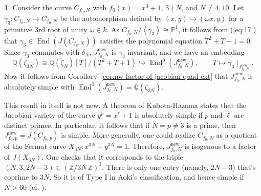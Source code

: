 \documentclass{amsart}[11pt]
\theoremstyle{definition}
\newtheorem{sect}[thm]{}
\numberwithin{equation}{section}
\theoremstyle{notitle}
\begin{document}
    

  

\begin{sect}\label{subsec:cube-x-plus-one}
  Consider the curve $C_{f_0,N}$ with $f_0(x)=x^3+1$, $3\nmid N$, and
  $N\neq 4, 10$. 
  Let $\gamma_3: C_{f_0,N}\to C_{f_0,N}$ be the automorphism defined by
  $(x,y)\mapsto (\omega x, y)$ for a primitive $3$rd root of unity
  $\omega\in k$.  As $C_{f_0,N}/{\left\langle {\gamma_3} \right\rangle}\cong {\mathbb{P}}^1$,
  it follows from (\ref{eq:17}) that $\gamma_3 \in \operatorname{End}
  (J(C_{f_0,N}))$ satisfies the polynomial equation $T^2+T+1=0$. Since
  $\gamma_3$ commutes with $\delta_N$, $J_{f_0,N}^{\mathrm{new}}$ is
  $\gamma_3$-invariant, and we have an embedding
  \[ {\mathbb{Q}}(\zeta_{3N})\cong
  {\mathbb{Q}}(\zeta_N)[T]/(T^2+T+1)\hookrightarrow \operatorname{End}^0(J_{f_0,N}^{\mathrm{new}}),
  \qquad T\mapsto \gamma_3\mid_{J_{f_0,N}^{\mathrm{new}}}.\] Now it follows from
  Corollary~\ref{cor:nw-factor-of-jacobian-quad-ext} that
  $J_{f_0,N}^{\mathrm{new}}$ is absolutely simple with
  $\operatorname{End}^0(J_{f_0,N}^{\mathrm{new}})={\mathbb{Q}}(\zeta_{3N})$.

  This result in itself is not new. A theorem of Kubota-Hazama
  \cite{MR1458755} states that the Jacobian variety of the curve $y^p
  = x^\ell+1$ is absolutely simple if $p$ and $\ell$ are distinct
  primes.  In particular, it follows that if $N=p\neq 3$ is a prime,
  then $J_{f_0, p}^{\mathrm{new}}=J(C_{f_0, p})$ is simple. More generally, one
  could realize $C_{f_0, N}$ as a quotient of the Fermat curve
  $X_{3N}: x^{3N}+y^{3N}=1$. Therefore, $J_{f_0, N}^{\mathrm{new}}$ is isogenous
  to a factor of $J(X_{3N})$. One checks that it corresponds to the
  triple $(N, 3, 2N-3)\in ({\mathbb{Z}/ {3N}\, \mathbb{Z}})^3$. There is only one entry
  (namely, $2N-3$) that's coprime to $3N$.  So it is of Type I in
  Aoki's classification, and hence simple if $N>60$ (cf. \cite[Theorem
  0.2]{MR1129293}).
 \end{sect}
\end{document}
